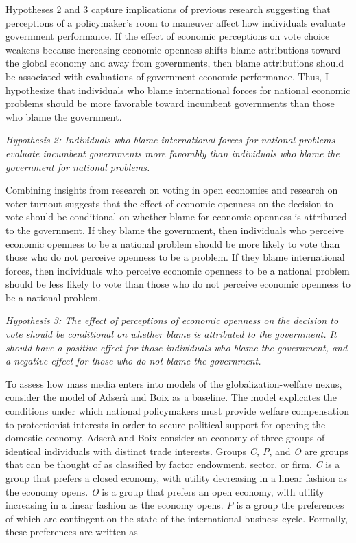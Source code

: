 \documentclass[12pt]{report}
\begin{document}
Hypotheses 2 and 3 capture implications of previous research suggesting that perceptions of a
policymaker's room to maneuver affect how individuals evaluate government performance. If the effect
of economic perceptions on vote choice weakens because increasing economic openness shifts blame
attributions toward the global economy and away from governments, then blame attributions should be
associated with evaluations of government economic performance. Thus, I hypothesize that individuals
who blame international forces for national economic problems should be more favorable toward
incumbent governments than those who blame the government.

\emph{Hypothesis 2: Individuals who blame international forces for national problems evaluate
incumbent governments more favorably than individuals who blame the government for national
problems.}

Combining insights from research on voting in open economies and research on voter turnout suggests
that the effect of economic openness on the decision to vote should be conditional on whether blame
for economic openness is attributed to the government. If they blame the government, then
individuals who perceive economic openness to be a national problem should be more likely to vote
than those who do not perceive openness to be a problem. If they blame international forces, then
individuals who perceive economic openness to be a national problem should be less likely to vote
than those who do not perceive economic openness to be a national problem.

\emph{Hypothesis 3: The effect of perceptions of economic openness on the decision to vote should be
conditional on whether blame is attributed to the government. It should have a positive effect for
those individuals who blame the government, and a negative effect for those who do not blame the
government.}

To assess how mass media enters into models of the globalization-welfare nexus, consider the model
of Adser\`{a} and Boix \citeyearpar[231-236]{Adsera:2002vt} as a baseline. The model explicates the
conditions under which national policymakers must provide welfare compensation to protectionist
interests in order to secure political support for opening the domestic economy. Adser\`{a} and Boix
consider an economy of three groups of identical individuals with distinct trade interests. Groups
\emph{C, P}, and \emph{O} are groups that can be thought of as classified by factor endowment,
sector, or firm. \emph{C} is a group that prefers a closed economy, with utility decreasing in a
linear fashion as the economy opens. \emph{O} is a group that prefers an open economy, with utility
increasing in a linear fashion as the economy opens. \emph{P} is a group the preferences of which
are contingent on the state of the international business cycle. Formally, these preferences are
written as
\end{document}
